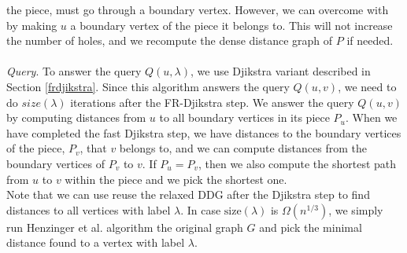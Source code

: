 the piece, must go through a boundary vertex. However, we can overcome with by making $u$
a boundary vertex of the piece it belongs to. This will not increase the number of holes,
and we recompute the dense distance graph of $P$ if needed. \\
\\
\indent \textit{Query}. To answer the query $Q(u,\lambda)$, we use Djikstra variant
described in Section \ref{frdjikstra}. Since this algorithm answers the query $Q(u,v)$,
we need to do $size(\lambda)$ iterations after the FR-Djikstra step. We answer the query
$Q(u,v)$ by computing distances from $u$ to all boundary vertices in its piece $P_u$.
When we have completed the fast Djikstra step, we have distances to the boundary vertices
of the piece, $P_v$, that $v$ belongs to, and we can compute distances from the boundary
vertices of $P_v$ to $v$. If $P_u=P_v$, then we also compute the shortest path from $u$
to $v$ within the piece and we pick the shortest one. \\
Note that we can use reuse the relaxed DDG after the Djikstra step to find distances to
all vertices with label $\lambda$. In case $\text{size}(\lambda)$ is $\Omega(n^{1/3})$, we simply run Henzinger et al.
\cite{henzinger1997faster} algorithm the original graph $G$ and pick the minimal distance
found to a vertex with label $\lambda$.

